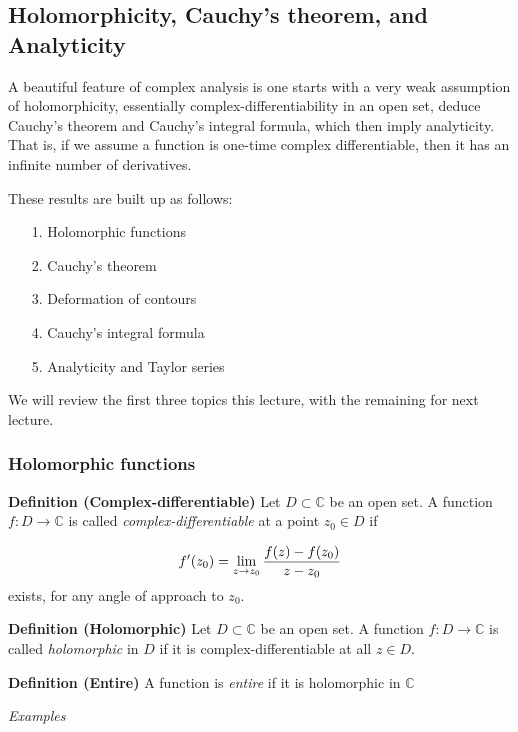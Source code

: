 \documentclass[12pt,a4paper]{article}
\begin{document}
\subsection{Holomorphicity, Cauchy's theorem, and Analyticity}
A beautiful feature of complex analysis is one starts with a very weak assumption of holomorphicity, essentially complex-differentiability in an open set, deduce Cauchy's theorem and Cauchy's integral formula, which then imply analyticity. That is, if we assume a function is one-time complex differentiable, then it has an infinite number of derivatives.

These results are built up as follows:

\begin{itemize}
\item[1. ] Holomorphic functions


\item[2. ] Cauchy's theorem


\item[3. ] Deformation of contours


\item[4. ] Cauchy's integral formula


\item[5. ] Analyticity and Taylor series

\end{itemize}
We will review the first three topics this lecture, with the remaining for next lecture.

\subsubsection{Holomorphic functions}
\textbf{Definition (Complex-differentiable)} Let $D \subset {\mathbb C}$ be an open set.  A function $f : D \rightarrow {\mathbb C}$ is called \emph{complex-differentiable} at a point $z_0 \in D$ if

\[
   f'(z_0) =  \lim_{z \rightarrow z_0} {f(z) - f(z_0) \over z - z_0}
\]
exists, for any angle of approach to $z_0$.

\textbf{Definition (Holomorphic)} Let $D \subset {\mathbb C}$ be an open set.  A function $f : D \rightarrow {\mathbb C}$ is called \emph{holomorphic} in $D$ if it is complex-differentiable at all $z \in D$.

\textbf{Definition (Entire)} A function is \emph{entire} if it is holomorphic in ${\mathbb C}$

\emph{Examples}
\end{document}
